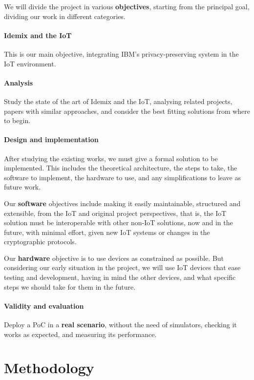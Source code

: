 We will divide the project in various \textbf{objectives}, starting from the principal goal, dividing our work in different categories.

\hfil

\paragraph{Idemix and the IoT}
This is our main objective, integrating IBM's privacy-preserving system in the IoT environment. 

\paragraph{Analysis} Study the state of the art of Idemix and the IoT, analysing related projects, papers with similar approaches, and consider the best fitting solutions from where to begin.

\paragraph{Design and implementation} After studying the existing works, we must give a formal solution to be implemented. This includes the theoretical architecture, the steps to take, the software to implement, the hardware to use, and any simplifications to leave as future work.

Our \textbf{software} objectives include making it easily maintainable, structured and extensible, from the IoT and original project perspectives, that is, the IoT solution must be interoperable with other non-IoT solutions, now and in the future, with minimal effort, given new IoT systems or changes in the cryptographic protocols.

Our \textbf{hardware} objective is to use devices as constrained as possible. But considering our early situation in the project, we will use IoT devices that ease testing and development, having in mind the other devices, and what specific steps we should take for them in the future.

\paragraph{Validity and evaluation} Deploy a \ac{PoC} in a \textbf{real scenario}, without the need of simulators, checking it works as expected, and measuring its performance.



\section{Methodology}

